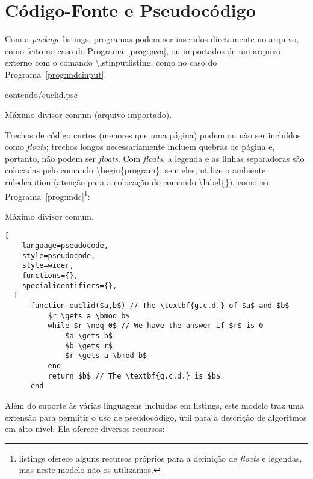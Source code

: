\chapter{Código-Fonte e Pseudocódigo}
\label{ap:pseudocode}

Com a \textit{package} \textsf{listings}, programas podem ser inseridos
diretamente no arquivo, como feito no caso do Programa~\ref{prog:java},
ou importados de um arquivo externo com o comando
\textsf{\textbackslash{}lstinputlisting}, como no caso
do Programa~\ref{prog:mdcinput}.

\begin{program}
  
  {conteudo/euclid.psc}

  \caption{Máximo divisor comum (arquivo importado).}
  \label{prog:mdcinput}
\end{program}

Trechos de código curtos (menores que uma página) podem ou não ser
incluídos como \textit{floats}; trechos longos necessariamente incluem
quebras de página e, portanto, não podem ser \textit{floats}. Com
\textit{floats}, a legenda e as linhas separadoras são colocadas pelo
comando \textsf{\textbackslash{}begin\{program\}}; sem eles, utilize
o ambiente \textsf{ruledcaption} (atenção para a colocação do comando
\textsf{\textbackslash{}label\{\}}), como no Programa~\ref{prog:mdc}\footnote{
\textsf{listings} oferece alguns recursos próprios para a definição
de \textit{floats} e legendas, mas neste modelo não os utilizamos.}:

\begin{ruledcaption}{Máximo divisor comum.\label{prog:mdc}}
  \begin{lstlisting}[
    language=pseudocode,
    style=pseudocode,
    style=wider,
    functions={},
    specialidentifiers={},
  ]
      function euclid($a,b$) // The \textbf{g.c.d.} of $a$ and $b$
          $r \gets a \bmod b$
          while $r \neq 0$ // We have the answer if $r$ is 0
              $a \gets b$
              $b \gets r$
              $r \gets a \bmod b$
          end
          return $b$ // The \textbf{g.c.d.} is $b$
      end
  \end{lstlisting}
\end{ruledcaption}

Além do suporte às várias linguagens incluídas em \textsf{listings},
este modelo traz uma extensão para permitir o uso de pseudocódigo,
útil para a descrição de algoritmos em alto nível. Ela oferece
diversos recursos:

